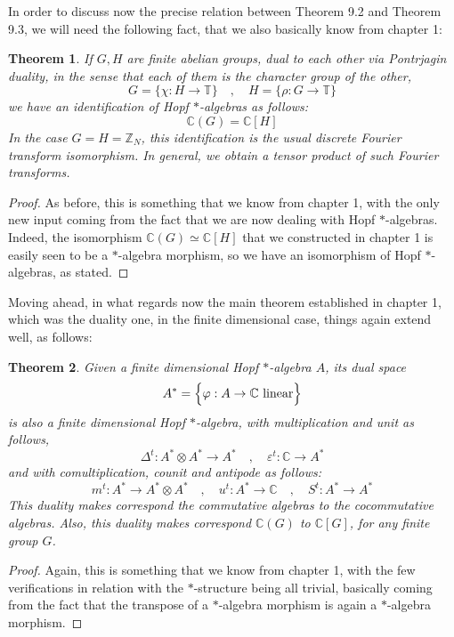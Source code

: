 \documentclass[12pt]{amsbook}
\newtheorem{theorem}{Theorem}[chapter]
\begin{document}
\bigskip

In order to discuss now the precise relation between Theorem 9.2 and Theorem 9.3, we will need the following fact, that we also basically know from chapter 1:

\begin{theorem}
If $G,H$ are finite abelian groups, dual to each other via Pontrjagin duality, in the sense that each of them is the character group of the other,
$$G=\big\{\chi:H\to\mathbb T\big\}\quad,\quad H=\big\{\rho:G\to\mathbb T\big\}$$
we have an identification of Hopf $*$-algebras as follows:
$$\mathbb C(G)=\mathbb C[H]$$
In the case $G=H=\mathbb Z_N$, this identification is the usual discrete Fourier transform isomorphism. In general, we obtain a tensor product of such Fourier transforms.
\end{theorem}

\begin{proof}
As before, this is something that we know from chapter 1, with the only new input coming from the fact that we are now dealing with Hopf $*$-algebras. Indeed, the isomorphism $\mathbb C(G)\simeq\mathbb C[H]$ that we constructed in chapter 1 is easily seen to be a $*$-algebra morphism, so we have an isomorphism of Hopf $*$-algebras, as stated.
\end{proof}

Moving ahead, in what regards now the main theorem established in chapter 1, which was the duality one, in the finite dimensional case, things again extend well, as follows:

\begin{theorem}
Given a finite dimensional Hopf $*$-algebra $A$, its dual space
$$A^*=\Big\{\varphi:A\to\mathbb C\ {\rm linear}\Big\}$$
is also a finite dimensional Hopf $*$-algebra, with multiplication and unit as follows,
$$\Delta^t:A^*\otimes A^*\to A^*\quad,\quad \varepsilon^t:\mathbb C\to A^*$$
and with comultiplication, counit and antipode as follows:
$$m^t:A^*\to A^*\otimes A^*\quad,\quad
u^t:A^*\to\mathbb C\quad,\quad 
S^t:A^*\to A^*$$
This duality makes correspond the commutative algebras to the cocommutative algebras. Also, this duality makes correspond $\mathbb C(G)$ to $\mathbb C[G]$, for any finite group $G$.
\end{theorem}

\begin{proof}
Again, this is something that we know from chapter 1, with the few verifications in relation with the $*$-structure being all trivial, basically coming from the fact that the transpose of a $*$-algebra morphism is again a $*$-algebra morphism.
\end{proof}
\end{document}
